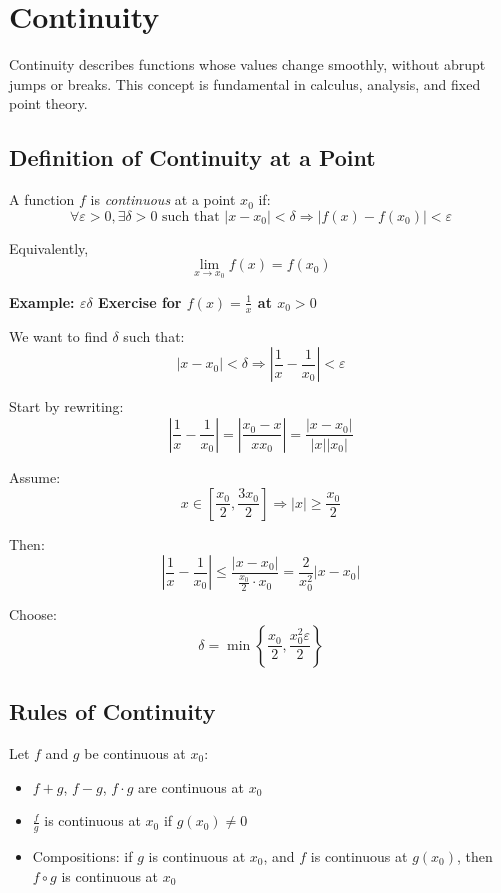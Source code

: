 \section{Continuity}

Continuity describes functions whose values change smoothly, without abrupt jumps or breaks. This concept is fundamental in calculus, analysis, and fixed point theory.

\subsection{Definition of Continuity at a Point}

A function \(f\) is \emph{continuous} at a point \(x_0\) if:
\[
\forall \varepsilon > 0, \exists \delta > 0 \text{ such that } |x - x_0| < \delta \Rightarrow |f(x) - f(x_0)| < \varepsilon
\]

Equivalently,
\[
\lim_{x \to x_0} f(x) = f(x_0)
\]

\textbf{Example: \(\varepsilon \delta\) Exercise for \(f(x) = \frac{1}{x}\) at \(x_0 > 0\)}

We want to find \(\delta\) such that:
\[
|x - x_0| < \delta \Rightarrow \left|\frac{1}{x} - \frac{1}{x_0}\right| < \varepsilon
\]

Start by rewriting:
\[
\left|\frac{1}{x} - \frac{1}{x_0}\right| = \left|\frac{x_0 - x}{xx_0}\right| = \frac{|x - x_0|}{|x||x_0|}
\]

Assume:
\[
x \in \left[\frac{x_0}{2}, \frac{3x_0}{2}\right] \Rightarrow |x| \ge \frac{x_0}{2}
\]

Then:
\[
\left|\frac{1}{x} - \frac{1}{x_0}\right| \le \frac{|x - x_0|}{\frac{x_0}{2} \cdot x_0} = \frac{2}{x_0^2} |x - x_0|
\]

Choose:
\[
\delta = \min\left\{\frac{x_0}{2}, \frac{x_0^2 \varepsilon}{2} \right\}
\]

\subsection{Rules of Continuity}

Let \(f\) and \(g\) be continuous at \(x_0\):

\begin{itemize}[label=\(-\)]
\item \(f + g\), \(f - g\), \(f \cdot g\) are continuous at \(x_0\)
\item \(\frac{f}{g}\) is continuous at \(x_0\) if \(g(x_0) \ne 0\)
\item Compositions: if \(g\) is continuous at \(x_0\), and \(f\) is continuous at \(g(x_0)\), then \(f \circ g\) is continuous at \(x_0\)
\end{itemize}

